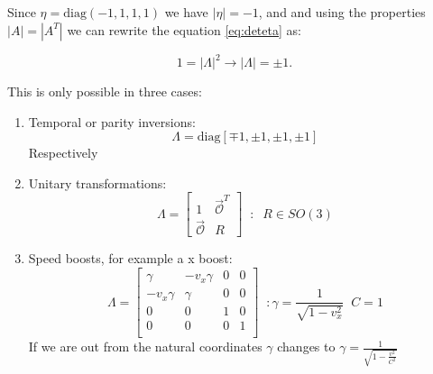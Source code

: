                 Since $\eta = \mathrm{diag}(-1,1,1,1)$ we have $|\eta| = -1$, and and using the properties $|A| = |A^T|$ we can rewrite the equation \ref{eq:deteta} as:
                
                \begin{equation*}
                    1 = |\Lambda|^2 \rightarrow |\Lambda| = \pm 1.
                \end{equation*}
                
                This is only possible in three cases:
                
                \begin{enumerate}
                    \item Temporal or parity inversions:
                    \begin{equation*}
                        \Lambda = \mathrm{diag}[\mp 1 , \pm 1 , \pm 1 , \pm 1]
                    \end{equation*}
                    Respectively
                    
                    \item Unitary transformations:
                    \begin{equation*}
                        \Lambda = 
                        \begin{bmatrix}
                        1 & \vec{
                        \mathcal{O}}^T \\
                        \vec{\mathcal{O}} & R
                        \end{bmatrix} \;\; : \;\; R \in SO(3)
                    \end{equation*}
                    
                    \item Speed boosts, for example a x boost:
                    \begin{equation}
                        \Lambda = 
                        \begin{bmatrix}
                        \gamma & -v_x\gamma & 0 & 0\\
                        -v_x\gamma & \gamma & 0 & 0\\
                        0 & 0 & 1 & 0\\
                        0 & 0 & 0 & 1\\
                        \end{bmatrix} \;\; : \gamma = \frac{1}{\sqrt{1 - v_x^2}} \;\; C = 1
                    \end{equation}
                    If we are out from the natural coordinates $\gamma$ changes to $\gamma = \frac{1}{\sqrt{1 - \frac{v^2}{C^2}}}$
                \end{enumerate}
                
